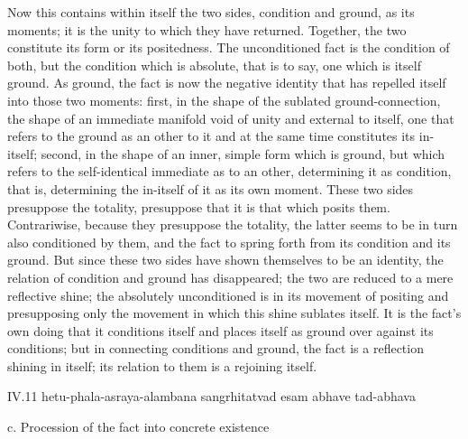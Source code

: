 Now this contains within itself the two sides,
condition and ground, as its moments;
it is the unity to which they have returned.
Together, the two constitute its form or its positedness.
The unconditioned fact is the condition of both,
but the condition which is absolute, that is to say,
one which is itself ground.
As ground, the fact is now the negative identity
that has repelled itself into those two moments:
first, in the shape of the sublated ground-connection,
the shape of an immediate manifold void of
unity and external to itself,
one that refers to the ground as an other to it
and at the same time constitutes its in-itself;
second, in the shape of an inner, simple form which is ground,
but which refers to the self-identical
immediate as to an other, determining it as condition,
that is, determining the in-itself of it as its own moment.
These two sides presuppose the totality,
presuppose that it is that which posits them.
Contrariwise, because they presuppose the totality,
the latter seems to be in turn also conditioned by them,
and the fact to spring forth from its condition and its ground.
But since these two sides have shown themselves to be an identity,
the relation of condition and ground has disappeared;
the two are reduced to a mere reflective shine;
the absolutely unconditioned is in its movement of positing
and presupposing only the movement in which this shine sublates itself.
It is the fact's own doing that it conditions itself
and places itself as ground over against its conditions;
but in connecting conditions and ground,
the fact is a reflection shining in itself;
its relation to them is a rejoining itself.

IV.11
hetu-phala-asraya-alambana sangrhitatvad esam abhave tad-abhava

c. Procession of the fact into concrete existence

